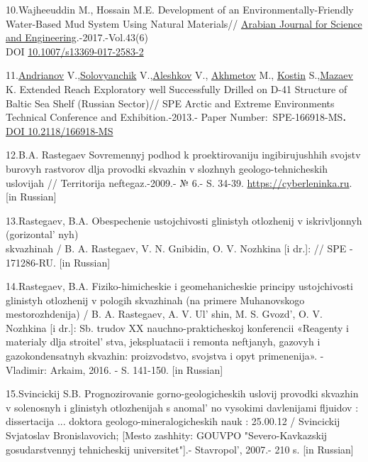 \begin{references}
10.Wajheeuddin M., Hossain M.E. Development of an
Environmentally-Friendly Water-Based Mud System Using Natural
Materials//
\href{https://www.researchgate.net/journal/Arabian-Journal-for-Science-and-Engineering-2191-4281?_tp=eyJjb250ZXh0Ijp7ImZpcnN0UGFnZSI6InB1YmxpY2F0aW9uIiwicGFnZSI6InB1YmxpY2F0aW9uIn19}{Arabian
Journal for Science and Engineering}.-2017.-Vol.43(6) \\DOI
\href{https://doi.org/10.1007/s13369-017-2583-2}{10.1007/s13369-017-2583-2}

11.\href{javascript:;}{Andrianov} V.,\href{javascript:;}{Solovyanchik}
V.,\href{javascript:;}{Aleshkov} V., \href{javascript:;}{Akhmetov} M.,
\href{javascript:;}{Kostin} S.,\href{javascript:;}{Mazaev} K. Extended
Reach Exploratory well Successfully Drilled on D-41 Structure of Baltic
Sea Shelf (Russian Sector)// SPE Arctic and Extreme Environments
Technical Conference and Exhibition.-2013.- Paper
Number:~SPE-166918-MS{\bfseries .}
\href{https://doi.org/10.2118/166918-MS}{DOI 10.2118/166918-MS}

12.B.A. Rastegaev Sovremennyj podhod k proektirovaniju ingibirujushhih
svojstv burovyh rastvorov dlja provodki skvazhin v slozhnyh
geologo-tehnicheskih uslovijah // Territorija neftegaz.-2009.- № 6.- S.
34-39.
\href{https://cyberleninka.ru/article/n/sovremennyy-podhod-k-proektirovaniyu-ingibiruyuschih-svoystv-burovyh-rastvorov-dlya-provodki-skvazhin-v-slozhnyh-geologo-tehnicheskih}{https://cyberleninka.ru}.
{[}in Russian{]}

13.Rastegaev, B.A. Obespechenie ustojchivosti glinistyh otlozhenij v
iskrivljonnyh (gorizontal' nyh) \\skvazhinah / B. A.
Rastegaev, V. N. Gnibidin, O. V. Nozhkina {[}i dr.{]}: // SPE -
171286-RU. {[}in Russian{]}

14.Rastegaev, B.A. Fiziko-himicheskie i geomehanicheskie principy
ustojchivosti glinistyh otlozhenij v pologih skvazhinah (na primere
Muhanovskogo mestorozhdenija) / B. A. Rastegaev, A. V.
Ul' shin, M. S. Gvozd', O. V. Nozhkina
{[}i dr.{]}: Sb. trudov XX nauchno-prakticheskoj konferencii «Reagenty i
materialy dlja stroitel' stva, jekspluatacii i remonta
neftjanyh, gazovyh i gazokondensatnyh skvazhin: proizvodstvo, svojstva i
opyt primenenija». - Vladimir: Arkaim, 2016. - S. 141-150. {[}in
Russian{]}

15.Svincickij S.B. Prognozirovanie gorno-geologicheskih uslovij provodki
skvazhin v solenosnyh i glinistyh otlozhenijah s
anomal' no vysokimi davlenijami fljuidov : dissertacija
... doktora geologo-mineralogicheskih nauk : 25.00.12 / Svincickij
Svjatoslav Bronislavovich; {[}Mesto zashhity: GOUVPO "Severo-Kavkazskij
gosudarstvennyj tehnicheskij universitet"{]}.-
Stavropol', 2007.- 210 s. {[}in Russian{]}


\end{references}
